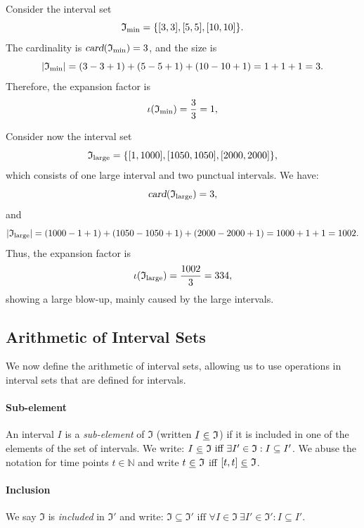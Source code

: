 \begin{example}
Consider the interval set
\[
\mathfrak{I}_{\min} = \{ [3,3], [5,5], [10,10] \}.
\]
The cardinality is $\textsl{card}(\mathfrak{I}_{\min}) = 3$, and the size is
\[
\vert \mathfrak{I}_{\min}\vert = (3 - 3 + 1) + (5 - 5 + 1) + (10 - 10 + 1) = 1 + 1 + 1 = 3.
\]
Therefore, the expansion factor is
\[
\iota(\mathfrak{I}_{\min}) = \frac{3}{3} = 1,
\]

\end{example}

\begin{example}
Consider now the interval set
\[
\mathfrak{I}_{\mathrm{large}} = \{ [1,1000], [1050,1050], [2000,2000] \},
\]
which consists of one large interval and two punctual intervals. We have:
\[
\textsl{card}(\mathfrak{I}_{\mathrm{large}}) = 3,
\]
and
\[
\vert \mathfrak{I}_{\mathrm{large}}\vert = (1000 - 1 + 1) + (1050 - 1050 + 1) + (2000 - 2000 + 1) = 1000 + 1 + 1 = 1002.
\]
Thus, the expansion factor is
\[
\iota(\mathfrak{I}_{\mathrm{large}}) = \frac{1002}{3} = 334,
\]
showing a large blow-up, mainly caused by the large intervals.
\end{example}

\subsection{Arithmetic of Interval Sets}\label{isarithmetic}
We now define the arithmetic of interval sets, allowing us to use operations in interval sets that are defined for intervals.
    \paragraph{Sub-element} An interval $I$ is a \emph{sub-element} of $\mathfrak{I}$ (written $I ~\underline{\in}~ \mathfrak{I}$) if it is included in one of the elements of the set of intervals. We write:
    $ I ~\underline{\in}~ \mathfrak{I} \text{ iff } \exists I' \in \mathfrak{I} : I \subseteq I' $. We abuse the notation for time points $t  \in \mathbb{N}$ and write $t ~\underline{\in}~ \mathfrak{I}$ iff $[t,t] ~\underline{\in}~ \mathfrak{I}$.

    \paragraph{Inclusion} We say $\mathfrak{I}$ is \emph{included} in $\mathfrak{I}'$ and write:
     $\mathfrak{I} \subseteq \mathfrak{I}' \text{ iff } \forall I \in \mathfrak{I} ~\exists I' \in \mathfrak{I}': I \subseteq I'$.

